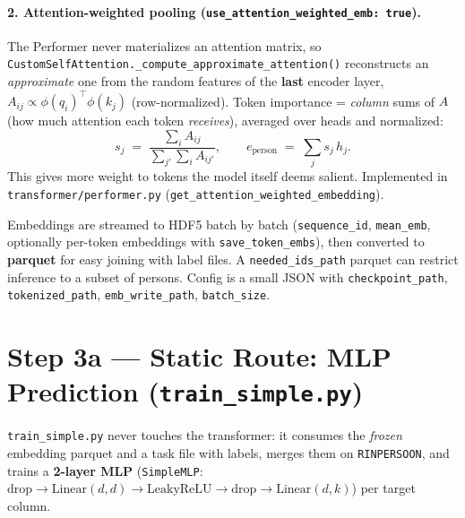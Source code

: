 \documentclass[11pt,a4paper]{article}
\newcommand{\file}[1]{\texttt{\small #1}}
\newcommand{\code}[1]{\texttt{\small #1}}
\begin{document}
\paragraph{2. Attention-weighted pooling (\code{use\_attention\_weighted\_emb:
true}).} The Performer never materializes an attention matrix, so
\code{CustomSelfAttention.\_compute\_approximate\_attention()} reconstructs an
\emph{approximate} one from the random features of the \textbf{last} encoder
layer, $A_{ij} \propto \phi(q_i)^\top \phi(k_j)$ (row-normalized). Token
importance = \emph{column} sums of $A$ (how much attention each token
\emph{receives}), averaged over heads and normalized:
\[
s_j \;=\; \frac{\sum_{i} A_{ij}}{\sum_{j'} \sum_{i} A_{ij'}},
\qquad
e_{\text{person}} \;=\; \sum_j s_j \, h_j .
\]
This gives more weight to tokens the model itself deems salient. Implemented in
\file{transformer/performer.py} (\code{get\_attention\_weighted\_embedding}).

\medskip
Embeddings are streamed to HDF5 batch by batch
(\code{sequence\_id}, \code{mean\_emb}, optionally per-token embeddings with
\code{save\_token\_embs}), then converted to \textbf{parquet} for easy joining
with label files. A \code{needed\_ids\_path} parquet can restrict inference to a
subset of persons. Config is a small JSON with
\code{checkpoint\_path}, \code{tokenized\_path}, \code{emb\_write\_path},
\code{batch\_size}.

\section{Step 3a --- Static Route: MLP Prediction
(\file{train\_simple.py})}\label{sec:trainsimple}

\code{train\_simple.py} never touches the transformer: it consumes the
\emph{frozen} embedding parquet and a task file with labels, merges them on
\code{RINPERSOON}, and trains a \textbf{2-layer MLP} (\code{SimpleMLP}:
$\mathrm{drop}\to\mathrm{Linear}(d,d)\to\mathrm{LeakyReLU}\to\mathrm{drop}\to
\mathrm{Linear}(d,k)$) per target column.
\end{document}
